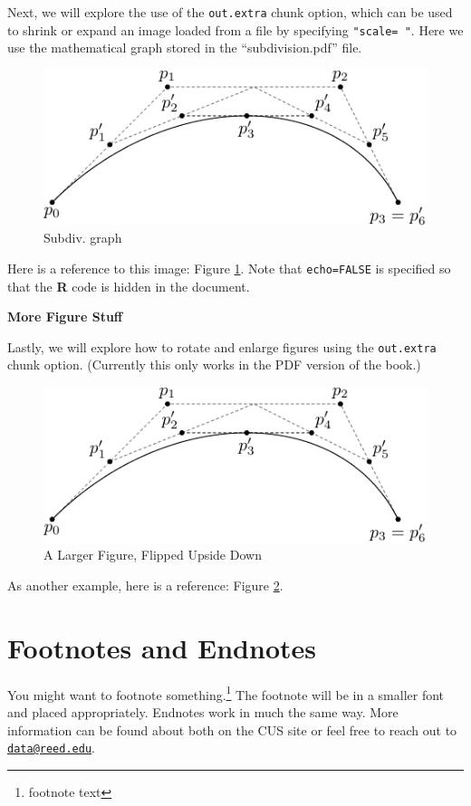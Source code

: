 \documentclass[12pt,twoside]{reedthesis}
\begin{document}
Next, we will explore the use of the \texttt{out.extra} chunk option, which can be used to shrink or expand an image loaded from a file by specifying \texttt{"scale=\ "}. Here we use the mathematical graph stored in the ``subdivision.pdf'' file.
\begin{figure}
\includegraphics[scale=0.75]{figure/subdivision} \caption{Subdiv. graph}\label{fig:subd}
\end{figure}
Here is a reference to this image: Figure \ref{fig:subd}. Note that \texttt{echo=FALSE} is specified so that the \textbf{R} code is hidden in the document.

\textbf{More Figure Stuff}

Lastly, we will explore how to rotate and enlarge figures using the \texttt{out.extra} chunk option. (Currently this only works in the PDF version of the book.)
\begin{figure}
\includegraphics[angle=180, scale=1.1]{figure/subdivision} \caption{A Larger Figure, Flipped Upside Down}\label{fig:subd2}
\end{figure}
As another example, here is a reference: Figure \ref{fig:subd2}.

\hypertarget{footnotes-and-endnotes}{%
\section{Footnotes and Endnotes}\label{footnotes-and-endnotes}}

You might want to footnote something.\footnote{footnote text} The footnote will be in a smaller font and placed appropriately. Endnotes work in much the same way. More information can be found about both on the CUS site or feel free to reach out to \href{mailto:data@reed.edu}{\nolinkurl{data@reed.edu}}.
\end{document}
